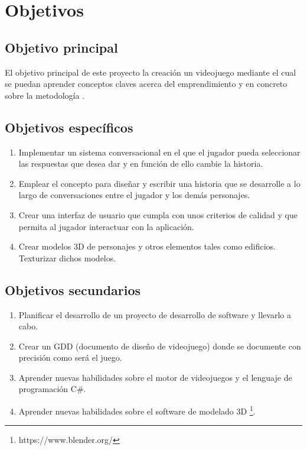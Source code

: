 \chapter{Objetivos}

\section{Objetivo principal}

El objetivo principal de este proyecto la creación un videojuego mediante el cual se puedan aprender conceptos claves acerca del emprendimiento y en concreto sobre la metodología .


\section{Objetivos específicos}

\begin{enumerate}
	\item Implementar un sistema conversacional en el que el jugador pueda seleccionar las respuestas que desea dar y en función de ello cambie la historia.
	\item Emplear el concepto  para diseñar y escribir una historia que se desarrolle a lo largo de conversaciones entre el jugador y los demás personajes.
	\item Crear una interfaz de usuario que cumpla con unos criterios de calidad y que permita al jugador interactuar con la aplicación.
	\item Crear modelos 3D de personajes y otros elementos tales como edificios. Texturizar dichos modelos.
\end{enumerate}


\section{Objetivos secundarios}

\begin{enumerate}
	\item Planificar el desarrollo de un proyecto de desarrollo de software y llevarlo a cabo.
	\item Crear un GDD (documento de diseño de videojuego) donde se documente con precisión como será el juego.
	\item Aprender nuevas habilidades sobre el motor de videojuegos  y el lenguaje de programación C\#.
	\item Aprender nuevas habilidades sobre el software de modelado 3D \footnote{https://www.blender.org/}.
\end{enumerate}



